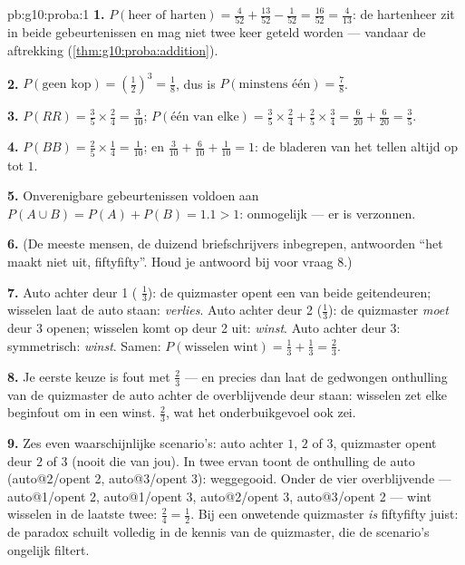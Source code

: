 \begin{solution}{pb:g10:proba:1}
\textbf{1.} $P(\text{heer of harten}) = \frac{4}{52} + \frac{13}{52} -
\frac{1}{52} = \frac{16}{52} = \frac{4}{13}$: de hartenheer zit in beide
gebeurtenissen en mag niet twee keer geteld worden --- vandaar de aftrekking
(\cref{thm:g10:proba:addition}).

\textbf{2.} $P(\text{geen kop}) = \left(\frac12\right)^3 = \frac18$, dus is
$P(\text{minstens één}) = \frac78$.

\textbf{3.} $P(RR) = \frac35 \times \frac24 = \frac{3}{10}$;
$P(\text{één van elke}) = \frac35 \times \frac24 + \frac25 \times \frac34 =
\frac{6}{20} + \frac{6}{20} = \frac35$.

\textbf{4.} $P(BB) = \frac25 \times \frac14 = \frac1{10}$; en
$\frac{3}{10} + \frac{6}{10} + \frac{1}{10} = 1$: de bladeren van het
 tellen altijd op tot $1$.

\textbf{5.} Onverenigbare gebeurtenissen voldoen aan
$P(A \cup B) = P(A) + P(B) = 1.1 > 1$: onmogelijk --- er is  verzonnen.

\textbf{6.} (De meeste mensen, de duizend briefschrijvers inbegrepen,
antwoorden ``het maakt niet uit, fiftyfifty''. Houd je antwoord bij voor
vraag 8.)

\textbf{7.} Auto achter deur 1 ( $\frac13$): de quizmaster opent een van
beide geitendeuren; wisselen laat de auto staan: \emph{verlies}. Auto achter
deur 2 ($\frac13$): de quizmaster \emph{moet} deur 3 openen; wisselen komt
op deur 2 uit: \emph{winst}. Auto achter deur 3: symmetrisch: \emph{winst}.
Samen: $P(\text{wisselen wint}) = \frac13 + \frac13 = \frac23$.

\textbf{8.} Je eerste keuze is fout met  $\frac23$ --- en precies dan
laat de gedwongen onthulling van de quizmaster de auto achter de
overblijvende deur staan: wisselen zet elke beginfout om in een winst.
$\frac23$, wat het onderbuikgevoel ook zei.

\textbf{9.} Zes even waarschijnlijke scenario's: auto achter $1$, $2$ of
$3$, quizmaster opent deur $2$ of $3$ (nooit die van jou). In twee ervan
toont de onthulling de auto (auto@2/opent 2, auto@3/opent 3): weggegooid.
Onder de vier overblijvende --- auto@1/opent 2, auto@1/opent 3, auto@2/opent
3, auto@3/opent 2 --- wint wisselen in de laatste twee:
$\frac24 = \frac12$. Bij een onwetende quizmaster \emph{is} fiftyfifty juist:
de paradox schuilt volledig in de kennis van de quizmaster, die de
scenario's ongelijk filtert.


\end{solution}
